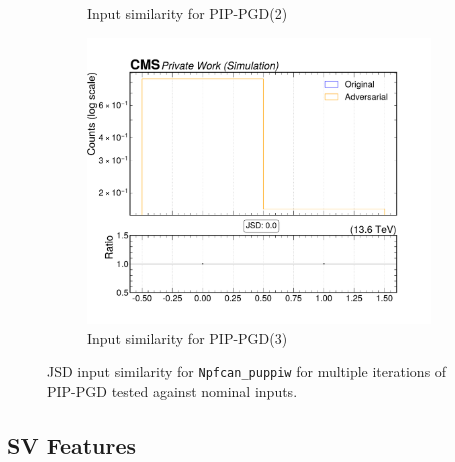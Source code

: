 \begin{figure}[htbp]
\begin{subfigure}[t]{0.32\textwidth}
    \caption*{Input similarity for PIP-PGD(2)}
  \end{subfigure}\hfill
  \begin{subfigure}[t]{0.32\textwidth}
    \includegraphics[width=\linewidth]{media/output/features/compare/combined_it_3/cmp_npf_arr_Npfcan_puppiw.pdf}
    \caption*{Input similarity for PIP-PGD(3)}
  \end{subfigure}

  \caption*{JSD input similarity for \texttt{Npfcan\_puppiw} for multiple iterations of PIP-PGD tested against nominal inputs.}
  \label{fig:combined_input_Npfcan_puppiw}
\end{figure}


\newpage
\subsection*{SV Features}

